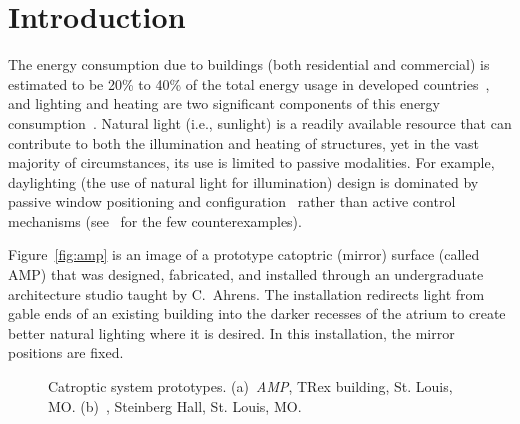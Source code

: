 \section{Introduction}
\label{sec:intro}

The energy consumption due to buildings (both residential and commercial)
is estimated to be 20\% to 40\% of the total energy usage in
developed countries~\cite{pop08}, and
lighting and heating are two significant components of this energy
consumption~\cite{keh05}.
Natural light (i.e., sunlight) is a readily available resource that
can contribute to both the illumination and heating of structures,
yet in the vast majority of circumstances, its use is limited to
passive modalities.  For example, daylighting (the use of natural
light for illumination) design is dominated by passive window positioning
and configuration~\cite{vgf+13} rather than active control mechanisms
(see~\cite{kt16} for the few counterexamples).


Figure~\ref{fig:amp} is an image of a prototype catoptric (mirror) surface
(called AMP) that was designed, fabricated, and installed through an
undergraduate architecture studio taught by C.~Ahrens. The installation
redirects light from gable ends of an existing building into the darker
recesses of the atrium to create better natural lighting where it is desired.
In this installation, the mirror positions are fixed.

\begin{figure}[ht]
\centering
{}
\qquad \qquad
{}
\caption{Catroptic system prototypes.
(a)~\emph{AMP}, TRex building, St. Louis, MO.
(b)~, Steinberg Hall, St. Louis, MO.
}
\label{fig:proto}
\end{figure}

